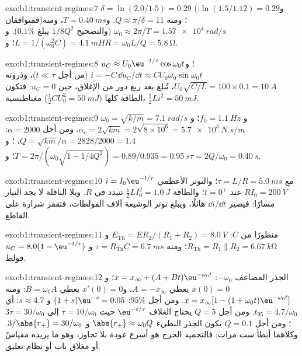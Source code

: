 \begin{solution}{exo:b1:transient-regimes:7}
$\delta = \ln(2.0/1.5) = 0.29$ (و$\ln(1.5/1.12) = 0.29$: فمتوافقان)؛
ومنه $Q \approx \pi/\delta = 11$. و$T = \qty{0.40}{ms}$، ومنه $\omega_0 \approx
2\pi/T = \qty{1.57e4}{rad/s}$ (والتصحيح $1/8Q^2$ يبلغ $0.1\%$).
و$L = 1/(\omega_0^2 C) = \qty{4.1}{mH}$؛ و$R = \omega_0 L/Q = \qty{5.8}{\ohm}$.
\end{solution}

\begin{solution}{exo:b1:transient-regimes:8}
$u_C \approx U_0\eu^{-t/\tau}\cos\omega_0 t$؛ و$i = -C\,\dd u_C/\dd t
\approx CU_0\omega_0\sin\omega_0 t$ (من أجل $t \ll \tau$)، وذروته $U_0\sqrt{C/L}
= 100 \times 0.1 = \qty{10}{A}$، تُبلغ بعد ربع دور من الإغلاق،
حين $u_C = 0$: فتكون الطاقة كلها ($\tfrac12 CU_0^2 = \qty{50}{mJ}$)
مغناطيسية، $\tfrac12 Li^2 = \qty{50}{mJ}$.
\end{solution}

\begin{solution}{exo:b1:transient-regimes:9}
$\omega_0 = \sqrt{k/m} = \qty{7.1}{rad/s}$ و $f_0 = \qty{1.1}{Hz}$؛
و$\alpha_c = 2\sqrt{km} = 2\sqrt{8\times10^6} = \qty{5.7e3}{N.s/m}$.
ومن أجل $\alpha = 2000$: $Q = \sqrt{km}/\alpha = 2828/2000 = 1.4$، ؛
و$T = 2\pi/(\omega_0\sqrt{1 - 1/4Q^2}) = 0.89/0.935 = \qty{0.95}{s}$؛
و$\tau = 2Q/\omega_0 = \qty{0.40}{s}$.
\end{solution}

\begin{solution}{exo:b1:transient-regimes:10}
$i = I_0\eu^{-t/\tau}$ مع $\tau = L/R = \qty{5.0}{ms}$؛ والتوتر الأعظمي
$RI_0 = \qty{200}{V}$ عند $t = 0^+$؛ والطاقة $\tfrac12 LI_0^2 = \qty{1.0}{J}$
تتبدد في $R$. وبلا الناقلة لا يجد التيار مسارًا:
فيصير $\dd i/\dd t$ هائلًا، ويبلغ توتر الوشيعة آلاف الفولطات، فتقفز شرارة
على القاطع.
\end{solution}

\begin{solution}{exo:b1:transient-regimes:11}
منظورًا من $C$: $E_{\mathrm{Th}} = ER_2/(R_1 + R_2) = \qty{8.0}{V}$ و
$R_{\mathrm{Th}} = R_1 \parallel R_2 = \qty{6.67}{k\ohm}$؛ ومنه $\tau =
R_{\mathrm{Th}}C = \qty{6.7}{ms}$ و $u_C = 8.0(1 - \eu^{-t/\tau})$ فولط.
\end{solution}

\begin{solution}{exo:b1:transient-regimes:12}
الجذر المضاعف $-\omega_0$: $x = x_\infty + (A + Bt)\eu^{-\omega_0 t}$؛
و$x(0) = 0$ يعطي $A = -x_\infty$، و$x'(0) = 0$ يعطي $B = \omega_0 A$:
ومنه $x = x_\infty[1 - (1 + \omega_0 t)\eu^{-\omega_0 t}]$. ومن أجل $95\%$:
$(1 + s)\eu^{-s} = 0.05$ و $s \approx 4.7$: أي $t_{95} = 4.7/\omega_0$. ومن أجل
$Q = 5$ يحتاج الغلاف $\eu^{-t/\tau}$ حيث $\tau = 10/\omega_0$ إلى
$3\tau = 30/\omega_0$؛ ومن أجل $Q = 0.1$ يكون الجذر البطيء $\abs{r_+} \approx
\omega_0 Q$ و $3/\abs{r_+} = 30/\omega_0$. وكلاهما أبطأ ست مرات:
فالتخميد الحرج هو أسرع عودة بلا تجاوز، وهو ما يريده
مقياسٌ أو مغلاق باب أو نظام تعليق.
\end{solution}

